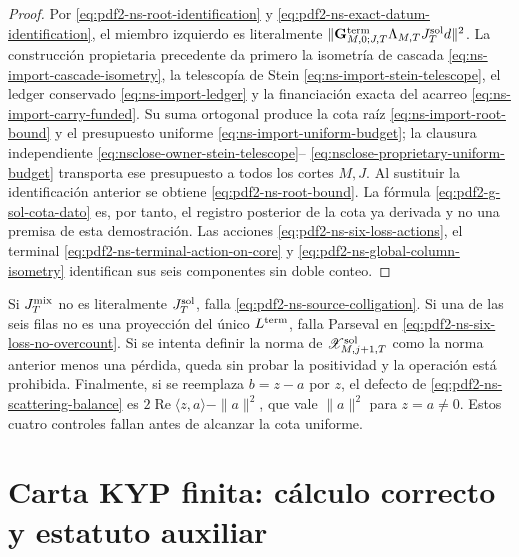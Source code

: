 \begin{proof}
Por \eqref{eq:pdf2-ns-root-identification} y
\eqref{eq:pdf2-ns-exact-datum-identification}, el miembro izquierdo es
literalmente
$\|\mathbf G_{M,0;J,T}^{\rm term}\Lambda_{M,T}J_T^{\rm sol}d\|^2$.
La construcción propietaria precedente da primero la isometría de cascada
\eqref{eq:ns-import-cascade-isometry}, la telescopía de Stein
\eqref{eq:ns-import-stein-telescope}, el ledger conservado
\eqref{eq:ns-import-ledger} y la financiación exacta del acarreo
\eqref{eq:ns-import-carry-funded}. Su suma ortogonal produce la cota raíz
\eqref{eq:ns-import-root-bound} y el presupuesto uniforme
\eqref{eq:ns-import-uniform-budget}; la clausura independiente
\eqref{eq:nsclose-owner-stein-telescope}--
\eqref{eq:nsclose-proprietary-uniform-budget} transporta ese presupuesto a
todos los cortes \(M,J\). Al sustituir la identificación anterior se obtiene
\eqref{eq:pdf2-ns-root-bound}. La fórmula
\eqref{eq:pdf2-g-sol-cota-dato} es, por tanto, el registro posterior de la
cota ya derivada y no una premisa de esta demostración. Las acciones
\eqref{eq:pdf2-ns-six-loss-actions}, el terminal
\eqref{eq:pdf2-ns-terminal-action-on-core} y
\eqref{eq:pdf2-ns-global-column-isometry} identifican sus seis componentes
sin doble conteo.
\end{proof}

\begin{falsifier}
Si $J_T^{\rm mix}$ no es literalmente $J_T^{\rm sol}$, falla
\eqref{eq:pdf2-ns-source-colligation}. Si una de las seis filas no es una
proyección del único $L^{\rm term}$, falla Parseval en
\eqref{eq:pdf2-ns-six-loss-no-overcount}. Si se intenta definir la norma de
$\mathscr X_{M,j+1,T}^{\rm sol}$ como la norma anterior menos una pérdida,
queda sin probar la positividad y la operación está prohibida. Finalmente, si
se reemplaza $b=z-a$ por $z$, el defecto de
\eqref{eq:pdf2-ns-scattering-balance} es
$2\operatorname{Re}\langle z,a\rangle-\|a\|^2$, que vale $\|a\|^2$ para
$z=a\ne0$. Estos cuatro controles fallan antes de alcanzar la cota uniforme.
\end{falsifier}

\section{Carta KYP finita: cálculo correcto y estatuto auxiliar}

